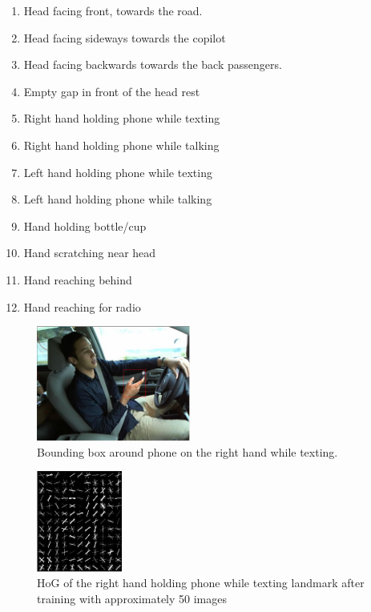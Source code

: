 \documentclass[10pt,twocolumn,letterpaper]{article}
\begin{document}
\begin{enumerate}
	\item Head facing front, towards the road.
	\item Head facing sideways towards the copilot
	\item Head facing backwards towards the back passengers.
	\item Empty gap in front of the head rest
	\item Right hand holding phone while texting
	\item Right hand holding phone while talking\
	\item Left hand holding phone while texting
	\item Left hand holding phone while talking
	\item Hand holding bottle/cup
	\item Hand scratching near head
	\item Hand reaching behind
	\item Hand reaching for radio	
\end{enumerate}


\begin{figure}[h]
	\centering
	\includegraphics[width=0.45\textwidth]{mult_HOG/HOG_phone_det}%
	\caption{Bounding box around phone on the right hand while texting. }
	\label{HoG_phone_det}
\end{figure}

\begin{figure}[h]
	\centering
		\includegraphics[width=0.25\textwidth]{mult_HOG/HOG_phone}
	\caption{HoG of the right hand holding phone while texting landmark after training with approximately 50 images}
		\label{HoG_phone}
	\end{figure}
\end{document}
